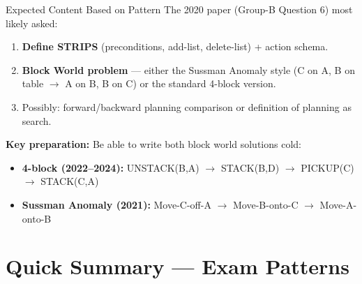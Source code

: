 \documentclass[12pt,a4paper]{article}
\begin{document}
\begin{solbox}{Expected Content Based on Pattern}
The 2020 paper (Group-B Question 6) most likely asked:
\begin{enumerate}[noitemsep]
  \item \textbf{Define STRIPS} (preconditions, add-list, delete-list) + action schema.
  \item \textbf{Block World problem} --- either the Sussman Anomaly style
    (C on A, B on table $\rightarrow$ A on B, B on C) or the standard 4-block version.
  \item Possibly: forward/backward planning comparison or definition of planning as search.
\end{enumerate}

\textbf{Key preparation:} Be able to write both block world solutions cold:
\begin{itemize}[noitemsep]
  \item \textbf{4-block (2022--2024):}
    UNSTACK(B,A) $\to$ STACK(B,D) $\to$ PICKUP(C) $\to$ STACK(C,A)
  \item \textbf{Sussman Anomaly (2021):}
    Move-C-off-A $\to$ Move-B-onto-C $\to$ Move-A-onto-B
\end{itemize}
\end{solbox}

\section*{Quick Summary --- Exam Patterns}
\end{document}
